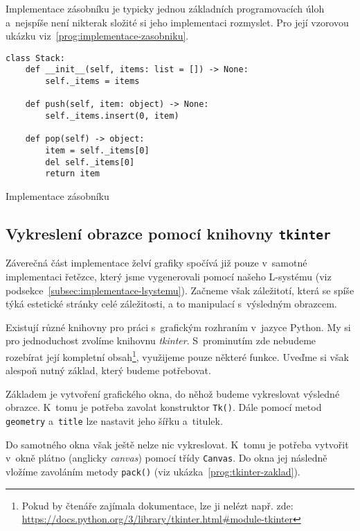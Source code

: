 Implementace zásobníku je typicky jednou základních programovacích úloh a~nejspíše není nikterak složité si jeho implementaci rozmyslet. Pro její vzorovou ukázku viz~\ref{prog:implementace-zasobniku}.
\begin{program}[h]
\begin{lstlisting}[style=python]
class Stack:
    def __init__(self, items: list = []) -> None:
        self._items = items

    def push(self, item: object) -> None:
        self._items.insert(0, item)
    
    def pop(self) -> object:
        item = self._items[0]
        del self._items[0]
        return item  
\end{lstlisting}
    \caption{Implementace zásobníku}
    \label{prog:implementace-zasobniku}
\end{program}

\subsection{Vykreslení obrazce pomocí knihovny \texttt{tkinter}}\label{subsec:vykresleni-obrazce}

Záverečná část implementace želví grafiky spočívá již pouze v~samotné implementaci řetězce, který jsme vygenerovali pomocí našeho L-systému (viz podsekce~\ref{subsec:implementace-lsystemu}). Začneme však záležitotí, která se spíše týká estetické stránky celé záležitosti, a to manipulací s~výsledným obrazcem.

Existují různé knihovny pro práci s~grafickým rozhraním v~jazyce Python. My si pro jednoduchost zvolíme knihovnu \emph{tkinter}. S~prominutím zde nebudeme rozebírat její kompletní obsah\footnote{Pokud by čtenáře zajímala dokumentace, lze ji nelézt např. zde: \url{https://docs.python.org/3/library/tkinter.html\#module-tkinter}}, využijeme pouze některé funkce. Uveďme si však alespoň nutný základ, který budeme potřebovat.

Základem je vytvoření grafického okna, do něhož budeme vykreslovat výsledné obrazce. K~tomu je potřeba zavolat konstruktor \texttt{Tk()}. Dále pomocí metod \texttt{geometry} a~\texttt{title} lze nastavit jeho šířku a~titulek.

Do samotného okna však ještě nelze nic vykreslovat. K~tomu je potřeba vytvořit v~okně plátno (anglicky \emph{canvas}) pomocí třídy \texttt{Canvas}. Do okna jej následně vložíme zavoláním metody \texttt{pack()} (viz ukázka~\ref{prog:tkinter-zaklad}).

